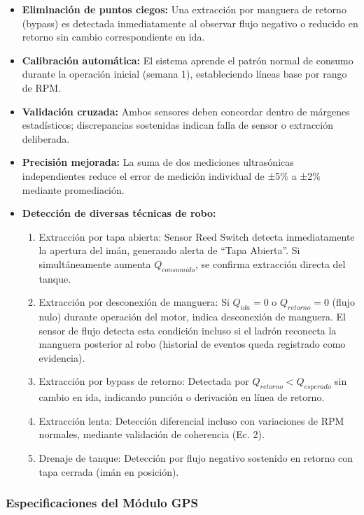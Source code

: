 \documentclass[twocolumn, 10pt]{article}
\begin{document}
\begin{itemize}
  \item \textbf{Eliminación de puntos ciegos:} Una extracción por manguera de retorno (bypass) es detectada inmediatamente al observar flujo negativo o reducido en retorno sin cambio correspondiente en ida.
  \item \textbf{Calibración automática:} El sistema aprende el patrón normal de consumo durante la operación inicial (semana 1), estableciendo líneas base por rango de RPM.
  \item \textbf{Validación cruzada:} Ambos sensores deben concordar dentro de márgenes estadísticos; discrepancias sostenidas indican falla de sensor o extracción deliberada.
  \item \textbf{Precisión mejorada:} La suma de dos mediciones ultrasónicas independientes reduce el error de medición individual de ±5\% a ±2\% mediante promediación.
  \item \textbf{Detección de diversas técnicas de robo:}
    \begin{enumerate}
      \item Extracción por tapa abierta: Sensor Reed Switch detecta inmediatamente la apertura del imán, generando alerta de ``Tapa Abierta''. Si simultáneamente aumenta $Q_{consumido}$, se confirma extracción directa del tanque.
      \item Extracción por desconexión de manguera: Si $Q_{ida} = 0$ o $Q_{retorno} = 0$ (flujo nulo) durante operación del motor, indica desconexión de manguera. El sensor de flujo detecta esta condición incluso si el ladrón reconecta la manguera posterior al robo (historial de eventos queda registrado como evidencia).
      \item Extracción por bypass de retorno: Detectada por $Q_{retorno} < Q_{esperado}$ sin cambio en ida, indicando punción o derivación en línea de retorno.
      \item Extracción lenta: Detección diferencial incluso con variaciones de RPM normales, mediante validación de coherencia (Ec. 2).
      \item Drenaje de tanque: Detección por flujo negativo sostenido en retorno con tapa cerrada (imán en posición).
    \end{enumerate}
\end{itemize}

\subsubsection*{Especificaciones del Módulo GPS}
\end{document}
